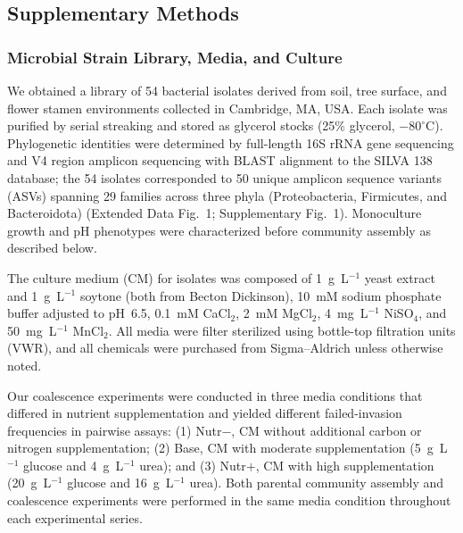 \subsection*{Supplementary Methods}
\label{sec:suppl:methods}

\subsubsection*{Microbial Strain Library, Media, and Culture}
\label{sec:suppl:strains}

We obtained a library of 54 bacterial isolates derived from soil, tree surface, and flower stamen environments collected in Cambridge, MA, USA. Each isolate was purified by serial streaking and stored as glycerol stocks (25\% glycerol, $-80^\circ$C). Phylogenetic identities were determined by full-length 16S rRNA gene sequencing and V4 region amplicon sequencing with BLAST alignment to the SILVA 138 database; the 54 isolates corresponded to 50 unique amplicon sequence variants (ASVs) spanning 29 families across three phyla (Proteobacteria, Firmicutes, and Bacteroidota) (Extended Data Fig.~1; Supplementary Fig.~1). Monoculture growth and pH phenotypes were characterized before community assembly as described below.

The culture medium (CM) for isolates was composed of 1~g~L$^{-1}$ yeast extract and 1~g~L$^{-1}$ soytone (both from Becton Dickinson), 10~mM sodium phosphate buffer adjusted to pH~6.5, 0.1~mM CaCl$_2$, 2~mM MgCl$_2$, 4~mg~L$^{-1}$ NiSO$_4$, and 50~mg~L$^{-1}$ MnCl$_2$. All media were filter sterilized using bottle-top filtration units (VWR), and all chemicals were purchased from Sigma--Aldrich unless otherwise noted.

Our coalescence experiments were conducted in three media conditions that differed in nutrient supplementation and yielded different failed-invasion frequencies in pairwise assays: (1) Nutr$-$, CM without additional carbon or nitrogen supplementation; (2) Base, CM with moderate supplementation (5~g~L$^{-1}$ glucose and 4~g~L$^{-1}$ urea); and (3) Nutr$+$, CM with high supplementation (20~g~L$^{-1}$ glucose and 16~g~L$^{-1}$ urea). Both parental community assembly and coalescence experiments were performed in the same media condition throughout each experimental series.

